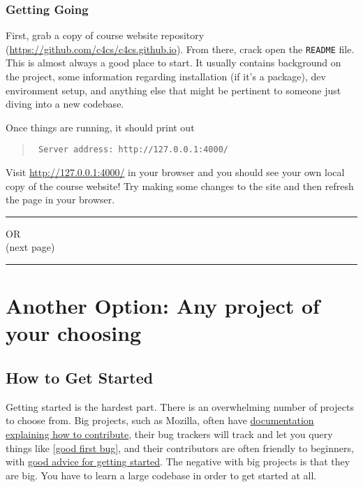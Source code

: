 \documentclass{article}
\begin{document}
\subsubsection*{Getting Going}

First, grab a copy of course website repository
(\url{https://github.com/c4cs/c4cs.github.io}). From there, crack open the
\texttt{README} file. This is almost always a good place to start. It usually
contains background on the project, some information regarding installation (if
it's a package), dev environment setup, and anything else that might be
pertinent to someone just diving into a new codebase.

Once things are running, it should print out
\begin{quote}\tt
  Server address: http://127.0.0.1:4000/
\end{quote}

Visit \url{http://127.0.0.1:4000/} in your browser and you should see your own
local copy of the course website! Try making some changes to the site and then
refresh the page in your browser.

\bigskip
\bigskip
\bigskip
\bigskip

{\centering
  \hrule
\bigskip
  \LARGE OR \\
  \Large (next page)
\bigskip
  \hrule
}


\newpage

\section*{Another Option: Any project of your choosing}


\subsection*{How to Get Started}

Getting started is the hardest part. There is an overwhelming number of
projects to choose from.
Big projects, such as Mozilla, often have
\href{https://developer.mozilla.org/en-US/docs/Introduction}
{documentation explaining how to contribute},
their bug trackers will track and let you query things like
\href{https://bugzilla.mozilla.org/buglist.cgi?resolution=---&classification=Client%20Software&emailtype1=regexp&status_whiteboard_type=allwordssubstr&query_format=advanced&emailassigned_to1=1&status_whiteboard=%5Bgood%20first%20bug%5D&email1=nobody}
{[good first bug]},
and their contributors are often friendly to beginners, with
\href{https://bugzilla.mozilla.org/show_bug.cgi?id=361983#c11}
{good advice for getting started}.
The negative with big projects is that they are big. You have to learn a large
codebase in order to get started at all.
\end{document}
